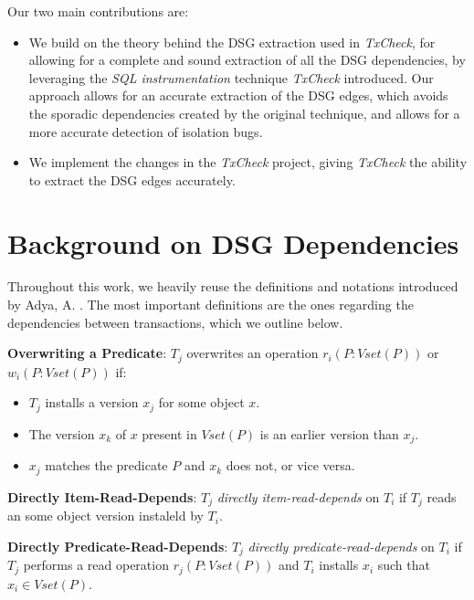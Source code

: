 Our two main contributions are:

\begin{itemize}
    \item We build on the theory behind the DSG extraction used in \textit{TxCheck}, for allowing for a complete and sound extraction of all the DSG dependencies, by leveraging the \textit{SQL instrumentation} technique \textit{TxCheck} introduced. Our approach allows for an accurate extraction of the DSG edges, which avoids the sporadic dependencies created by the original technique, and allows for a more accurate detection of isolation bugs.
    \item We implement the changes in the \textit{TxCheck} project, giving \textit{TxCheck} the ability to extract the DSG edges accurately.
\end{itemize}


\section{Background on DSG Dependencies}

Throughout this work, we heavily reuse the definitions and notations introduced by Adya, A. \cite{adya1999weak}. The most important definitions are the ones regarding the dependencies between transactions, which we outline below.

\begin{definition}
    \label{def:overwriting}
    \textbf{Overwriting a Predicate}: $T_j$ overwrites an operation $r_i(P: Vset(P))$ or $w_i(P: Vset(P))$ if:
    \begin{itemize}
        \item $T_j$ installs a version $x_j$ for some object $x$.
        \item The version $x_k$ of $x$ present in $Vset(P)$ is an earlier version than $x_j$.
        \item $x_j$ matches the predicate $P$ and $x_k$ does not, or vice versa.
    \end{itemize}  
\end{definition}

\begin{definition}
    \textbf{Directly Item-Read-Depends}: $T_j$ \textit{directly item-read-depends} on $T_i$ if $T_j$ reads an some object version instaleld by $T_i$.
\end{definition}

\begin{definition}
    \textbf{Directly Predicate-Read-Depends}: $T_j$ \textit{directly predicate-read-depends} on $T_i$ if $T_j$ performs a read operation $r_j(P: Vset(P))$ and $T_i$ installs $x_i$ such that $x_i \in Vset(P)$.
\end{definition}

